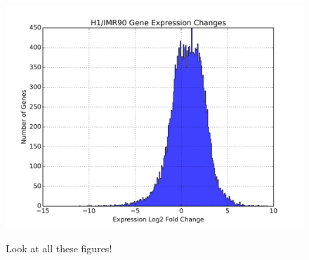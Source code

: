 \begin{figure}[htb]
  \includegraphics[width=\textwidth]{./figures/supplementary/expressionDelta.png}\label{fig:i90h1expression}
  \caption{Look at all these figures!}
\end{figure}

